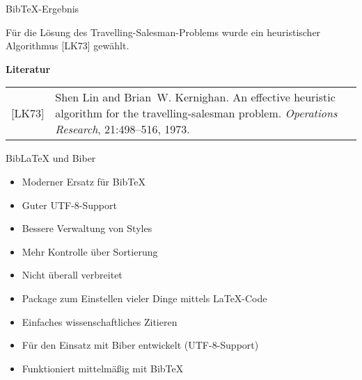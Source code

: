 \documentclass{beamer}
\begin{document}
		
		\begin{frame}{Bib\TeX{}-Ergebnis}
			
			\vspace{0.2cm}
			Für die Lösung des Travelling-Salesman-Problems
			wurde ein heuristischer Algorithmus [LK73]
			gewählt.
			
			\vspace{0.5cm}
			{\Large \textbf{Literatur}}\\
			
			\vspace{0.3cm}
			\begin{tabular}{lp{9cm}}
				[LK73] & Shen Lin and Brian~W. Kernighan. An effective heuristic algorithm for
				         the travelling-salesman problem.
				         {\em Operations Research}, 21:498--516, 1973.
			\end{tabular}
		\end{frame}

		
		\begin{frame}{Bib\LaTeX{} und Biber}

			\begin{itemize}
				\item Moderner Ersatz für Bib\TeX{}
				\item Guter UTF-8-Support
				\item Bessere Verwaltung von Styles
				\item Mehr Kontrolle über Sortierung
				\item Nicht überall verbreitet
			\end{itemize}
			\begin{itemize}
				\item Package zum Einstellen vieler Dinge mittels \LaTeX{}-Code
				\item Einfaches wissenschaftliches Zitieren
				\item Für den Einsatz mit Biber entwickelt (UTF-8-Support)
				\item Funktioniert mittelmäßig mit Bib\TeX{}
			\end{itemize}


		\end{frame}
\end{document}
